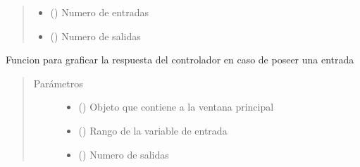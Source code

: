 \documentclass[letterpaper,10pt,spanish]{sphinxmanual}
\begin{document}
\begin{fulllineitems}
\begin{fulllineitems}
\begin{quote}
\begin{description}
\begin{itemize}
\item {} 
 () \textendash{} Numero de entradas

\item {} 
 () \textendash{} Numero de salidas

\end{itemize}

\end{description}\end{quote}

\end{fulllineitems}


\begin{fulllineitems}
\label{\detokenize{codigos/rutinas_fuzzy:rutinas_fuzzy.FuzzyController.graficar_respuesta_2d}}
Funcion para graficar la respuesta del controlador en caso de poseer una entrada
\begin{quote}\begin{description}
\item[{Parámetros}] \leavevmode\begin{itemize}
\item {} 
 () \textendash{} Objeto que contiene a la ventana principal

\item {} 
 () \textendash{} Rango de la variable de entrada

\item {} 
 () \textendash{} Numero de salidas

\end{itemize}

\end{description}\end{quote}

\end{fulllineitems}


\end{fulllineitems}
\end{document}

